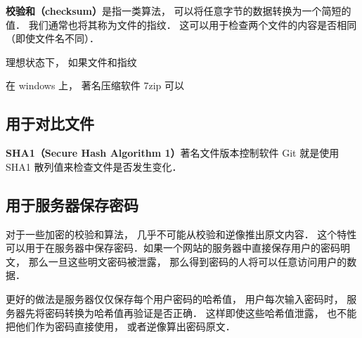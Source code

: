
\textbf{校验和（checksum）}是指一类算法， 可以将任意字节的数据转换为一个简短的值． 我们通常也将其称为文件的指纹． 这可以用于检查两个文件的内容是否相同（即使文件名不同）． %




理想状态下， 如果文件和指纹

在 windows 上， 著名压缩软件 7zip %
可以

\subsection{用于对比文件}
\textbf{SHA1（Secure Hash Algorithm 1）}著名文件版本控制软件 Git %
就是使用 SHA1 散列值来检查文件是否发生变化．

\subsection{用于服务器保存密码}
对于一些加密的校验和算法， 几乎不可能从校验和逆像推出原文内容． 这个特性可以用于在服务器中保存密码．如果一个网站的服务器中直接保存用户的密码明文， 那么一旦这些明文密码被泄露， 那么得到密码的人将可以任意访问用户的数据．

更好的做法是服务器仅仅保存每个用户密码的哈希值， 用户每次输入密码时， 服务器先将密码转换为哈希值再验证是否正确． 这样即使这些哈希值泄露， 也不能把他们作为密码直接使用， 或者逆像算出密码原文．
